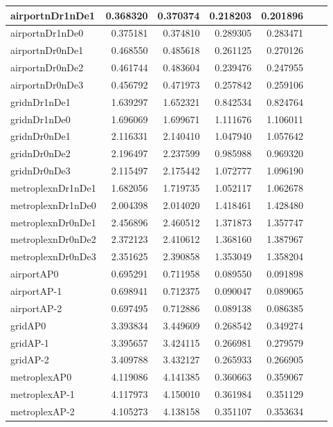 \begin{longtable}{|l|r|r|r|r|r|r|}
\endlastfoot
airportnDr1nDe1 & 0.368320 & 0.370374 & 0.218203 & 0.201896 \\ \hline
airportnDr1nDe0 & 0.375181 & 0.374810 & 0.289305 & 0.283471 \\ \hline
airportnDr0nDe1 & 0.468550 & 0.485618 & 0.261125 & 0.270126 \\ \hline
airportnDr0nDe2 & 0.461744 & 0.483604 & 0.239476 & 0.247955 \\ \hline
airportnDr0nDe3 & 0.456792 & 0.471973 & 0.257842 & 0.259106 \\ \hline
gridnDr1nDe1 & 1.639297 & 1.652321 & 0.842534 & 0.824764 \\ \hline
gridnDr1nDe0 & 1.696069 & 1.699671 & 1.111676 & 1.106011 \\ \hline
gridnDr0nDe1 & 2.116331 & 2.140410 & 1.047940 & 1.057642 \\ \hline
gridnDr0nDe2 & 2.196497 & 2.237599 & 0.985988 & 0.969320 \\ \hline
gridnDr0nDe3 & 2.115497 & 2.175442 & 1.072777 & 1.096190 \\ \hline
metroplexnDr1nDe1 & 1.682056 & 1.719735 & 1.052117 & 1.062678 \\ \hline
metroplexnDr1nDe0 & 2.004398 & 2.014020 & 1.418461 & 1.428480 \\ \hline
metroplexnDr0nDe1 & 2.456896 & 2.460512 & 1.371873 & 1.357747 \\ \hline
metroplexnDr0nDe2 & 2.372123 & 2.410612 & 1.368160 & 1.387967 \\ \hline
metroplexnDr0nDe3 & 2.351625 & 2.390858 & 1.353049 & 1.358204 \\ \hline
airportAP0 & 0.695291 & 0.711958 & 0.089550 & 0.091898 \\ \hline
airportAP-1 & 0.698941 & 0.712375 & 0.090047 & 0.089065 \\ \hline
airportAP-2 & 0.697495 & 0.712886 & 0.089138 & 0.086385 \\ \hline
gridAP0 & 3.393834 & 3.449609 & 0.268542 & 0.349274 \\ \hline
gridAP-1 & 3.395657 & 3.424115 & 0.266981 & 0.279579 \\ \hline
gridAP-2 & 3.409788 & 3.432127 & 0.265933 & 0.266905 \\ \hline
metroplexAP0 & 4.119086 & 4.141385 & 0.360663 & 0.359067 \\ \hline
metroplexAP-1 & 4.117973 & 4.150010 & 0.361984 & 0.351129 \\ \hline
metroplexAP-2 & 4.105273 & 4.138158 & 0.351107 & 0.353634 \\ \hline

\end{longtable}
